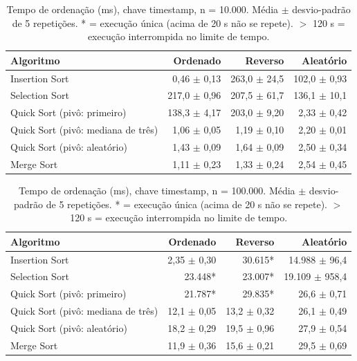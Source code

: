 
\begin{table}[ht]
\centering
\caption{Tempo de ordena\c{c}\~ao (ms), chave timestamp, n = 10.000. M\'edia $\pm$ desvio-padr\~ao de 5 repeti\c{c}\~oes. * = execu\c{c}\~ao \'unica (acima de 20 s n\~ao se repete). $>$ 120 s = execu\c{c}\~ao interrompida no limite de tempo. }
\label{tab:tempo-timestamp-10000}
\begin{tabular}{lrrr}
\hline
Algoritmo & Ordenado & Reverso & Aleat\'orio \\
\hline
Insertion Sort & 0,46 $\pm$ 0,13 & 263,0 $\pm$ 24,5 & 102,0 $\pm$ 0,93 \\
Selection Sort & 217,0 $\pm$ 0,96 & 207,5 $\pm$ 61,7 & 136,1 $\pm$ 10,1 \\
Quick Sort (piv\^o: primeiro) & 138,3 $\pm$ 4,17 & 203,0 $\pm$ 9,20 & 2,33 $\pm$ 0,42 \\
Quick Sort (piv\^o: mediana de tr\^es) & 1,06 $\pm$ 0,05 & 1,19 $\pm$ 0,10 & 2,20 $\pm$ 0,01 \\
Quick Sort (piv\^o: aleat\'orio) & 1,43 $\pm$ 0,09 & 1,64 $\pm$ 0,09 & 2,50 $\pm$ 0,34 \\
Merge Sort & 1,11 $\pm$ 0,23 & 1,33 $\pm$ 0,24 & 2,54 $\pm$ 0,45 \\
\hline
\end{tabular}
\end{table}

\begin{table}[ht]
\centering
\caption{Tempo de ordena\c{c}\~ao (ms), chave timestamp, n = 100.000. M\'edia $\pm$ desvio-padr\~ao de 5 repeti\c{c}\~oes. * = execu\c{c}\~ao \'unica (acima de 20 s n\~ao se repete). $>$ 120 s = execu\c{c}\~ao interrompida no limite de tempo. }
\label{tab:tempo-timestamp-100000}
\begin{tabular}{lrrr}
\hline
Algoritmo & Ordenado & Reverso & Aleat\'orio \\
\hline
Insertion Sort & 2,35 $\pm$ 0,30 & 30.615* & 14.988 $\pm$ 96,4 \\
Selection Sort & 23.448* & 23.007* & 19.109 $\pm$ 958,4 \\
Quick Sort (piv\^o: primeiro) & 21.787* & 29.835* & 26,6 $\pm$ 0,71 \\
Quick Sort (piv\^o: mediana de tr\^es) & 12,1 $\pm$ 0,05 & 13,2 $\pm$ 0,32 & 26,1 $\pm$ 0,49 \\
Quick Sort (piv\^o: aleat\'orio) & 18,2 $\pm$ 0,29 & 19,5 $\pm$ 0,96 & 27,9 $\pm$ 0,54 \\
Merge Sort & 11,9 $\pm$ 0,36 & 15,6 $\pm$ 0,21 & 29,5 $\pm$ 0,69 \\
\hline
\end{tabular}
\end{table}

